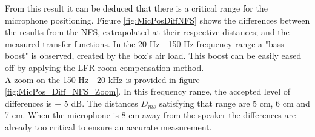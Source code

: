 \documentclass{report}
\begin{document}
From this result it can be deduced that there is a critical range for the microphone positioning. Figure \ref{fig:MicPosDiffNFS} shows the differences between the results from the NFS, extrapolated at their respective distances; and the measured transfer functions. In the 20 Hz - 150 Hz frequency range a "bass boost" is observed, created by the box's air load. This boost can be easily eased off by applying the LFR room compensation method.\\
A zoom on the 150 Hz - 20 kHz is provided in figure \ref{fig:MicPos_Diff_NFS_Zoom}. In this frequency range, the accepted level of differences is $\pm$ 5 dB. The distances $D_{ms}$ satisfying that range are 5 cm, 6 cm and 7 cm. When the microphone is 8 cm away from the speaker the differences are already too critical to ensure an accurate measurement. \\
\end{document}
